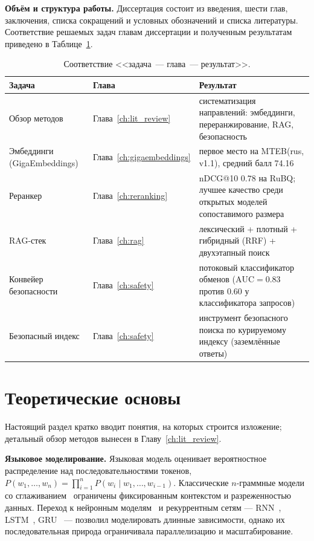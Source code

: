 \textbf{Объём и структура работы.} Диссертация состоит из введения, шести глав, заключения, списка сокращений и условных обозначений и списка литературы. Соответствие решаемых задач главам диссертации и полученным результатам приведено в Таблице~\ref{tab:intro_map}.

\begin{table}[H]
    \centering
    \caption{Соответствие <<задача~--- глава~--- результат>>.}
    \label{tab:intro_map}
    \begin{tabular}{p{}p{}p{}}
        \toprule
        Задача & Глава & Результат \\
        \midrule
        Обзор методов & Глава~\ref{ch:lit_review} & систематизация направлений: эмбеддинги, переранжирование, RAG, безопасность \\
        Эмбеддинги (GigaEmbeddings) & Глава~\ref{ch:gigaembeddings} & первое место на MTEB(rus, v1.1), средний балл 74.16 \\
        Реранкер & Глава~\ref{ch:reranking} & nDCG@10 $0.78$ на RuBQ; лучшее качество среди открытых моделей сопоставимого размера \\
        RAG-стек & Глава~\ref{ch:rag} & лексический + плотный + гибридный (RRF) + двухэтапный поиск \\
        Конвейер безопасности & Глава~\ref{ch:safety} & потоковый классификатор обменов ($\mathrm{AUC}=0.83$ против $0.60$ у классификатора запросов) \\
        Безопасный индекс & Глава~\ref{ch:safety} & инструмент безопасного поиска по курируемому индексу (заземлённые ответы) \\
        \bottomrule
    \end{tabular}
\end{table}

\section*{Теоретические основы}

Настоящий раздел кратко вводит понятия, на которых строится изложение; детальный обзор методов вынесен в Главу~\ref{ch:lit_review}.

\textbf{Языковое моделирование.} Языковая модель оценивает вероятностное распределение над последовательностями токенов, $P(w_1,\ldots,w_n) = \prod_{i=1}^{n} P(w_i \mid w_1,\ldots,w_{i-1})$. Классические $n$-граммные модели со сглаживанием~\cite{chen1999empirical} ограничены фиксированным контекстом и разреженностью данных. Переход к нейронным моделям~\cite{bengio2003neural} и рекуррентным сетям --- RNN~\cite{mikolov2010recurrent}, LSTM~\cite{hochreiter1997lstm}, GRU~\cite{cho2014gru} --- позволил моделировать длинные зависимости, однако их последовательная природа ограничивала параллелизацию и масштабирование.

